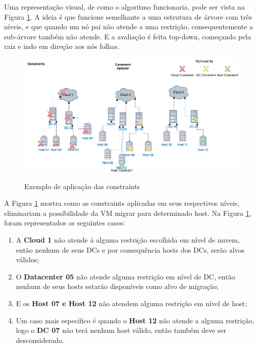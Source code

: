 Uma representação visual, de como o algoritmo funcionaria, pode ser vista na Figura \ref{fig:constraintapplyier}. 
A ideia é que funcione semelhante a uma estrutura de árvore com três níveis, e que quando um nó pai não atende 
a uma restrição, consequentemente a sub-árvore também não atende. E a avaliação é feita top-down, começando pela
raiz e indo em direção aos nós folhas.

\begin{figure}[!htb]
  \centering
  \caption{Exemplo de aplicação das constraints}
  \includegraphics[width=1\textwidth]{./dados/figuras/constraintapplyier}
  \label{fig:constraintapplyier}
\end{figure}

A Figura \ref{fig:constraintapplyier} mostra como as constraints aplicadas em seus respectivos níveis, eliminariam a possíbilidade
da VM migrar para determinado host. Na Figura \ref{fig:constraintapplyier}, foram representados os seguintes casos:

\begin{enumerate}
\item A \textbf{Cloud 1} não atende à alguma restrição escolhida em nível de nuvem, então nenhum de seus DCs e por consequência hosts dos DCs, serão alvos válidos;
\item O \textbf{Datacenter 05} não atende alguma restrição em nível de DC, então nenhum de seus hosts estarão disponíveis como alvo de migração;
\item E os \textbf{Host 07 e Host 12} não atendem alguma restrição em nível de host;
\item Um caso mais específico é quando o \textbf{Host 12} não atende a alguma restrição, logo o \textbf{DC 07} não terá nenhum host válido, então também deve ser desconsiderado.
\end{enumerate}

